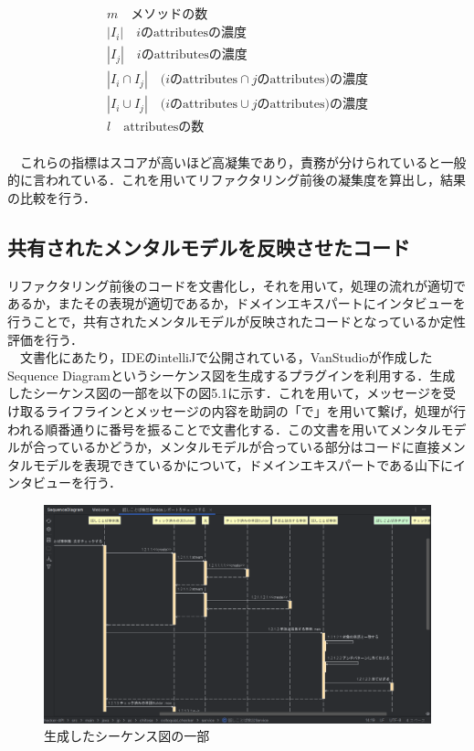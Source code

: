 \documentclass[12pt, a4paper]{jreport}
\begin{document}
\begin{gather*}
m\text{　メソッドの数}
\\|{I}_{i}|\text{　}i\text{のattributesの濃度}
\\|{I}_{j}|\text{　}i\text{のattributesの濃度}
\\|{I}_{i}\cap{I}_{j}|\text{　}(i\text{のattributes}\cap j\text{のattributes)の濃度}
\\|{I}_{i}\cup{I}_{j}|\text{　}(i\text{のattributes}\cup j\text{のattributes)の濃度}
\\l\text{　attributesの数}
\end{gather*}
\\　これらの指標はスコアが高いほど高凝集であり，責務が分けられていると一般的に言われている．これを用いてリファクタリング前後の凝集度を算出し，結果の比較を行う．
\subsection{共有されたメンタルモデルを反映させたコード}
リファクタリング前後のコードを文書化し，それを用いて，処理の流れが適切であるか，またその表現が適切であるか，ドメインエキスパートにインタビューを行うことで，共有されたメンタルモデルが反映されたコードとなっているか定性評価を行う．
\\　文書化にあたり，IDEのintelliJで公開されている，VanStudioが作成したSequence Diagram\cite{sequence}というシーケンス図を生成するプラグインを利用する．生成したシーケンス図の一部を以下の図5.1に示す．これを用いて，メッセージを受け取るライフラインとメッセージの内容を助詞の「で」を用いて繋げ，処理が行われる順番通りに番号を振ることで文書化する．この文書を用いてメンタルモデルが合っているかどうか，メンタルモデルが合っている部分はコードに直接メンタルモデルを表現できているかについて，ドメインエキスパートである山下にインタビューを行う．
\begin{figure}[H]
\centering
\includegraphics[width=1\linewidth]{image/sequence.png}
\caption{生成したシーケンス図の一部}
\label{fig:enter-label}
\end{figure}
\end{document}
